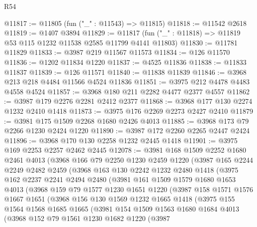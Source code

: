 \begin{lexlean}{R54}
\begin{coremodule}
@11817 := @11805 (fun ("_" : @11543) => @11815)
@11818 := @11542 @2618
@11819 := @1407 @3894
@11829 := @11817 (fun ("_" : @11818) => @11819 @53 @115 @1232 @11538 @2585 @11799 @4141 @11803)
@11830 := @11781 @11829
@11833 := @3987 @219 @11567 @11573
@11834 := @126 @11570
@11836 := @1202 @11834 @1220
@11837 := @4525 @11836
@11838 := @11833 @11837
@11839 := @126 @11571
@11840 := @11838 @11839
@11846 := @3968 @213 @218 @4484 @11566 @4524 @11836
@11851 := @3975 @212 @4478 @4483 @4558 @4524
@11857 := @3968 @180 @211 @2282 @4477 @2377 @4557
@11862 := @3987 @179 @2276 @2281 @2412 @2377
@11868 := @3968 @177 @130 @2274 @1232 @2410 @1418
@11873 := @3975 @176 @2269 @2273 @2427 @2410
@11879 := @3981 @175 @1509 @2268 @1680 @2426 @4013
@11885 := @3968 @173 @79 @2266 @1230 @2424 @1220
@11890 := @3987 @172 @2260 @2265 @2447 @2424
@11896 := @3968 @170 @130 @2258 @1232 @2445 @1418
@11901 := @3975 @169 @2253 @2257 @2462 @2445
@12078 := @3981
    @168
    @1509
    @2252
    @1680
    @2461
    @4013
    (@3968
      @166
      @79
      @2250
      @1230
      @2459
      @1220
      (@3987
        @165
        @2244
        @2249
        @2482
        @2459
        (@3968
          @163
          @130
          @2242
          @1232
          @2480
          @1418
          (@3975
            @162
            @2237
            @2241
            @2494
            @2480
            (@3981
              @161
              @1509
              @1579
              @1680
              @1653
              @4013
              (@3968
                @159
                @79
                @1577
                @1230
                @1651
                @1220
                (@3987
                  @158
                  @1571
                  @1576
                  @1667
                  @1651
                  (@3968
                    @156
                    @130
                    @1569
                    @1232
                    @1665
                    @1418
                    (@3975
                      @155
                      @1564
                      @1568
                      @1685
                      @1665
                      (@3981
                        @154
                        @1509
                        @1563
                        @1680
                        @1684
                        @4013
                        (@3968
                          @152
                          @79
                          @1561
                          @1230
                          @1682
                          @1220
                          (@3987

\end{coremodule}
\end{lexlean}

